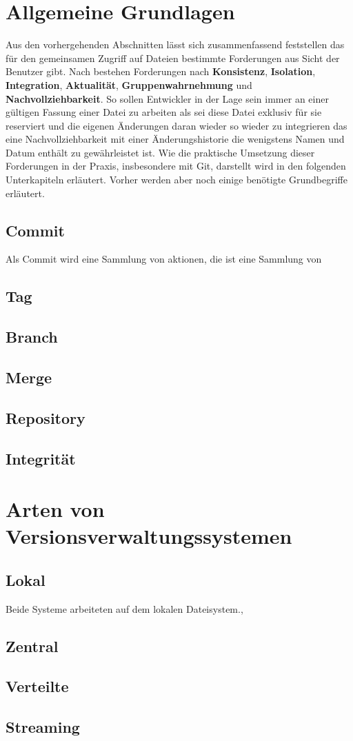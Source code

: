 \section{Allgemeine Grundlagen}\label{sec:Grundlagen}
Aus den vorhergehenden Abschnitten lässt sich zusammenfassend feststellen das
für den gemeinsamen Zugriff auf Dateien bestimmte Forderungen aus Sicht der
Benutzer gibt. Nach \cite[S.~37]{hagen:1678} bestehen Forderungen nach
\textbf{Konsistenz}, \textbf{Isolation}, \textbf{Integration},
\textbf{Aktualität}, \textbf{Gruppenwahrnehmung} und
\textbf{Nachvollziehbarkeit}. So sollen Entwickler in der Lage sein immer an
einer gültigen Fassung einer Datei zu arbeiten als sei diese Datei exklusiv für
sie reserviert und die eigenen Änderungen daran wieder so wieder zu integrieren
das eine Nachvollziehbarkeit mit einer Änderungshistorie die wenigstens Namen
und Datum enthält zu gewährleistet ist.  Wie die praktische Umsetzung dieser
Forderungen in der Praxis, insbesondere mit Git, darstellt wird in den
folgenden Unterkapiteln erläutert. Vorher werden aber noch einige benötigte
Grundbegriffe erläutert. 

\subsection{Commit}
Als Commit wird eine Sammlung von aktionen, die ist eine Sammlung von
\subsection{Tag}\label{sec:Tags}
\subsection{Branch}\label{sec:Branches}
\subsection{Merge}
\subsection{Repository}
\subsection{Integrität}

\section{Arten von Versionsverwaltungssystemen}
\subsection{Lokal}
Beide Systeme arbeiteten auf dem lokalen
Dateisystem.,
\subsection{Zentral}
\subsection{Verteilte}
\subsection{Streaming}

\label{sec:why}

